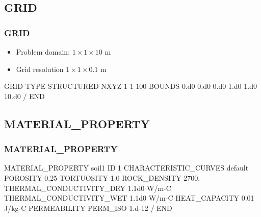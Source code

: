 \documentclass{beamer}
\begin{document}
\subsection{GRID}
\begin{frame}\frametitle{GRID}

\begin{itemize}
  \item Problem domain: $1 \times 1 \times 10$ m
  \item Grid resolution $1 \times 1 \times 0.1$ m
\end{itemize}

\begin{semiverbatim}
GRID
  TYPE STRUCTURED
  NXYZ 1 1 100
  BOUNDS
    0.d0 0.d0 0.d0
    1.d0 1.d0 10.d0
  /
END
\end{semiverbatim}

\end{frame}
\subsection{MATERIAL\_PROPERTY}

\begin{frame}\frametitle{MATERIAL\_PROPERTY}

\begin{semiverbatim}
MATERIAL_PROPERTY soil1
  ID 1
  CHARACTERISTIC_CURVES default
  POROSITY 0.25
  TORTUOSITY 1.0
  ROCK_DENSITY 2700.
  THERMAL_CONDUCTIVITY_DRY 1.1d0 W/m-C
  THERMAL_CONDUCTIVITY_WET 1.1d0 W/m-C
  HEAT_CAPACITY 0.01 J/kg-C
  PERMEABILITY
    PERM_ISO 1.d-12 
  /
END
\end{semiverbatim}

\end{frame}
\end{document}

